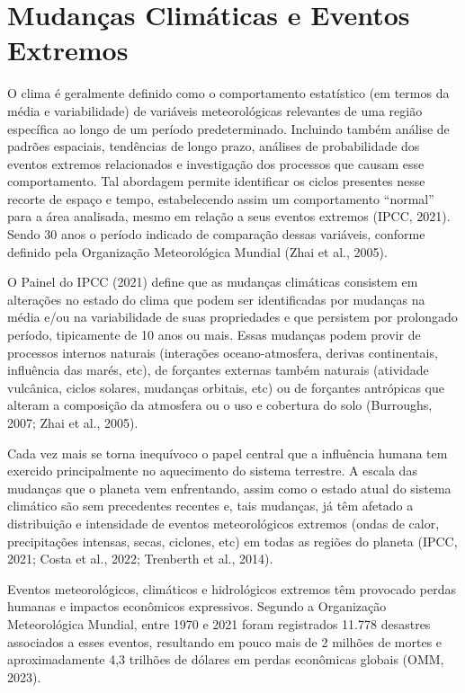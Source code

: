 \documentclass[12pt,a4paper,oneside]{book}
\begin{document}
\section{Mudanças Climáticas e Eventos Extremos}

O clima é geralmente definido como o comportamento estatístico (em termos da média e variabilidade) de variáveis meteorológicas relevantes de uma região específica ao longo de um período predeterminado. Incluindo também análise de padrões espaciais, tendências de longo prazo, análises de probabilidade dos eventos extremos relacionados e investigação dos processos que causam esse comportamento. Tal abordagem permite identificar os ciclos presentes nesse recorte de espaço e tempo, estabelecendo assim um comportamento ``normal'' para a área analisada, mesmo em relação a seus eventos extremos (IPCC, 2021). Sendo 30 anos o período indicado de comparação dessas variáveis, conforme definido pela Organização Meteorológica Mundial (Zhai et al., 2005).

O Painel do IPCC (2021) define que as mudanças climáticas consistem em alterações no estado do clima que podem ser identificadas por mudanças na média e/ou na variabilidade de suas propriedades e que persistem por prolongado período, tipicamente de 10 anos ou mais. Essas mudanças podem provir de processos internos naturais (interações oceano-atmosfera, derivas continentais, influência das marés, etc), de forçantes externas também naturais (atividade vulcânica, ciclos solares, mudanças orbitais, etc) ou de forçantes antrópicas que alteram a composição da atmosfera ou o uso e cobertura do solo (Burroughs, 2007; Zhai et al., 2005).

Cada vez mais se torna inequívoco o papel central que a influência humana tem exercido principalmente no aquecimento do sistema terrestre. A escala das mudanças que o planeta vem enfrentando, assim como o estado atual do sistema climático são sem precedentes recentes e, tais mudanças, já têm afetado a distribuição e intensidade de eventos meteorológicos extremos (ondas de calor, precipitações intensas, secas, ciclones, etc) em todas as regiões do planeta (IPCC, 2021; Costa et al., 2022; Trenberth et al., 2014).

Eventos meteorológicos, climáticos e hidrológicos extremos têm provocado perdas humanas e impactos econômicos expressivos. Segundo a Organização Meteorológica Mundial, entre 1970 e 2021 foram registrados 11.778 desastres associados a esses eventos, resultando em pouco mais de 2 milhões de mortes e aproximadamente 4,3 trilhões de dólares em perdas econômicas globais (OMM, 2023).
\end{document}
